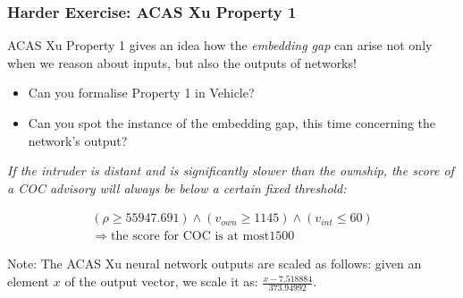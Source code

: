 \documentclass[t,compress,aspectratio=169]{beamer}
\begin{document}
\begin{frame}
\frametitle{Harder Exercise: ACAS Xu Property 1}
\vspace{-2em}
\small{
ACAS Xu Property 1 gives an idea how the {\it embedding gap}
 can arise not only when we reason about inputs, but also  the outputs of networks!

\begin{itemize}
\item Can you formalise Property 1 in Vehicle?
\item Can you spot the instance of the embedding gap, this time concerning the network's output?
\end{itemize}}

\pause

\begin{definition}
\small{\it If the intruder is distant and is significantly slower than the ownship, the score of a COC advisory will always be below a certain fixed threshold:}



\begin{equation*}
\begin{array}{l}
(\rho \geq 55947.691) \wedge
(v_{own} \geq 1145) \wedge (v_{int} \leq 60)  \\
\Rightarrow \text{the score for COC is at most} 1500
\end{array}
\end{equation*}
\end{definition}

\pause

\begin{block}{Note:}
The ACAS Xu neural network outputs are scaled as follows: given an element $x$ of the output vector, we scale it as: $\frac{x - 7.518884}{373.94992}$.
\end{block}

\end{frame}
\end{document}
